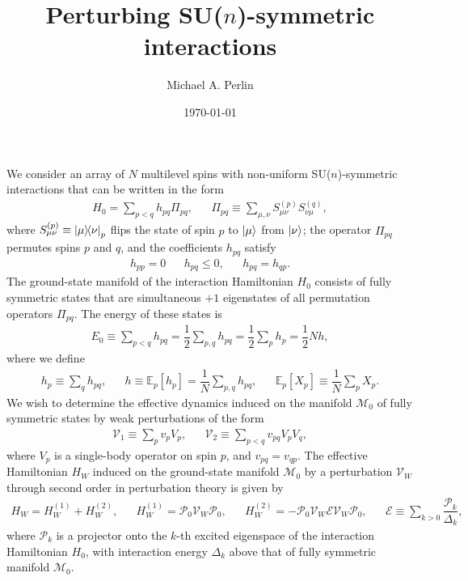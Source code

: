 \documentclass[nofootinbib,notitlepage,11pt]{revtex4-2}
\newcommand{\f}[2]{\dfrac{#1}{#2}} %
\renewcommand{\sp}[1]{\left[#1\right]} %
\newcommand{\1}{\mathds{1}}
\newcommand{\E}{\mathcal{E}}
\newcommand{\M}{\mathcal{M}}
\renewcommand{\P}{\mathcal{P}}
\newcommand{\V}{\mathcal{V}}
\newcommand{\EE}{\mathbb{E}}
\begin{document}
\thispagestyle{fancy}

\title{Perturbing SU($n$)-symmetric interactions}%
\author{Michael A. Perlin}%
\date{\today}

\maketitle

We consider an array of $N$ multilevel spins with non-uniform
SU($n$)-symmetric interactions that can be written in the form
\begin{align}
  H_0 = \sum_{p<q} h_{pq} \Pi_{pq},
  &&
  \Pi_{pq} \equiv \sum_{\mu,\nu} S_{\mu\nu}^{(p)} S_{\nu\mu}^{(q)},
\end{align}
where $S_{\mu\nu}^{(p)}\equiv\op{\mu}{\nu}_p$ flips the state of spin
$p$ to $\ket\mu$ from $\ket\nu$; the operator $\Pi_{pq}$ permutes
spins $p$ and $q$, and the coefficients $h_{pq}$ satisfy
\begin{align}
  h_{pp} = 0
  &&
  h_{pq} \le 0,
  &&
  h_{pq} = h_{qp}.
\end{align}
The ground-state manifold of the interaction Hamiltonian $H_0$
consists of fully symmetric states that are simultaneous $+1$
eigenstates of all permutation operators $\Pi_{pq}$.  The energy of
these states is
\begin{align}
  E_0 \equiv \sum_{p<q} h_{pq} = \f12 \sum_{p,q} h_{pq}
  = \f12 \sum_p h_p = \f12 N h,
\end{align}
where we define
\begin{align}
  h_p \equiv \sum_q h_{pq},
  &&
  h \equiv \EE_p\sp{h_p} = \f1N \sum_{p,q} h_{pq},
  &&
  \EE_p\sp{X_p} \equiv \f1N \sum_p X_p.
\end{align}
We wish to determine the effective dynamics induced on the manifold
$\M_0$ of fully symmetric states by weak perturbations of the form
\begin{align}
  \V_1 \equiv \sum_p v_p V_p,
  &&
  \V_2 \equiv \sum_{p<q} v_{pq} V_p V_q,
  \label{eq:perturbations}
\end{align}
where $V_p$ is a single-body operator on spin $p$, and
$v_{pq}=v_{qp}$.  The effective Hamiltonian $H_W$ induced on the
ground-state manifold $\M_0$ by a perturbation $\V_W$ through second
order in perturbation theory is given by\cite{bravyi2011schrieffer,
  perlin2019effective}
\begin{align}
  H_W = H_W^{(1)} + H_W^{(2)},
  &&
  H_W^{(1)} = \P_0 \V_W \P_0,
  &&
  H_W^{(2)} = - \P_0 \V_W \E \V_W \P_0,
  &&
  \E \equiv \sum_{k>0} \f{\P_k}{\Delta_k},
\end{align}
where $\P_k$ is a projector onto the $k$-th excited eigenspace of the
interaction Hamiltonian $H_0$, with interaction energy $\Delta_k$
above that of fully symmetric manifold $\M_0$.
\end{document}
